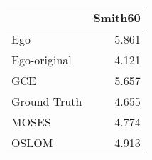 \begin{tabular}{lr}
\toprule
{} & Smith60 \\
\midrule
Ego          &   5.861 \\
Ego-original &   4.121 \\
GCE          &   5.657 \\
Ground Truth &   4.655 \\
MOSES        &   4.774 \\
OSLOM        &   4.913 \\
\bottomrule
\end{tabular}
